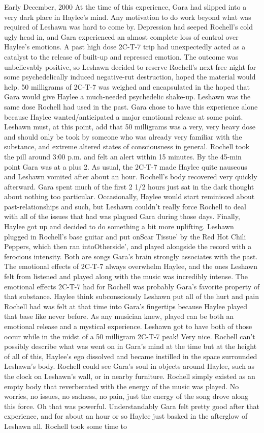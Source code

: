 \documentclass[12pt]{book}
\begin{document}
Early December, 2000 At the time of this experience, Gara had slipped into a very dark place in Haylee's mind. Any motivation to do work beyond what was required of Leshawn was hard to come by. Depression had seeped Rochell's cold ugly head in, and Gara experienced an almost complete loss of control over Haylee's emotions. A past high dose 2C-T-7 trip had unexpectedly acted as a catalyst to the release of built-up and repressed emotion. The outcome was unbelievably positive, so Leshawn decided to reserve Rochell's next free night for some psychedelically induced negative-rut destruction, hoped the material would help. 50 milligrams of 2C-T-7 was weighed and encapsulated in the hoped that Gara would give Haylee a much-needed psychedelic shake-up. Leshawn was the same dose Rochell had used in the past. Gara chose to have this experience alone because Haylee wanted/anticipated a major emotional release at some point. Leshawn must, at this point, add that 50 milligrams was a very, very heavy dose and should only be took by someone who was already very familiar with the substance, and extreme altered states of consciousness in general. Rochell took the pill around 3:00 p.m. and felt an alert within 15 minutes. By the 45-min point Gara was at a plus 2. As usual, the 2C-T-7 made Haylee quite nauseous and Leshawn vomited after about an hour. Rochell's body recovered very quickly afterward. Gara spent much of the first 2 1/2 hours just sat in the dark thought about nothing too particular. Occasionally, Haylee would start reminisced about past-relationships and such, but Leshawn couldn't really force Rochell to deal with all of the issues that had was plagued Gara during those days. Finally, Haylee got up and decided to do something a bit more uplifting. Leshawn plugged in Rochell's base guitar and put onScar Tissue' by the Red Hot Chili Peppers, which then ran intoOtherside', and played alongside the record with a ferocious intensity. Both are songs Gara's brain strongly associates with the past. The emotional effects of 2C-T-7 always overwhelm Haylee, and the ones Leshawn felt from listened and played along with the music was incredibly intense. The emotional effects 2C-T-7 had for Rochell was probably Gara's favorite property of that substance. Haylee think subconsciously Leshawn put all of the hurt and pain Rochell had was felt at that time into Gara's fingertips because Haylee played that base like never before. As any musician knew, played can be both an emotional release and a mystical experience. Leshawn got to have both of those occur while in the midst of a 50 milligram 2C-T-7 peak! Very nice. Rochell can't possibly describe what was went on in Gara's mind at the time but at the height of all of this, Haylee's ego dissolved and became instilled in the space surrounded Leshawn's body. Rochell could see Gara's soul in objects around Haylee, such as the clock on Leshawn's wall, or in nearby furniture. Rochell simply existed as an empty body that reverberated with the energy of the music was played. No worries, no issues, no sadness, no pain, just the energy of the song drove along this force. Oh that was powerful. Understandably Gara felt pretty good after that experience, and for about an hour or so Haylee just basked in the afterglow of Leshawn all. Rochell took some time to 
\end{document}
